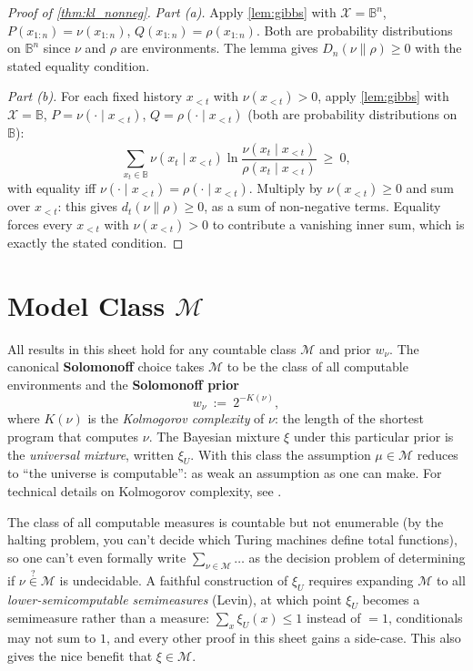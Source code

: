 \documentclass[fontsize=11pt, parskip=half]{scrartcl}
\newcommand{\Mc}{\mathcal{M}}
\begin{document}
\begin{proof}[Proof of \cref{thm:kl_nonneg}]
\textit{Part (a).} Apply \cref{lem:gibbs} with $\mathcal{X} = \mathbb{B}^n$, $P(x_{1:n}) = \nu(x_{1:n})$, $Q(x_{1:n}) = \rho(x_{1:n})$. Both are probability distributions on $\mathbb{B}^n$ since $\nu$ and $\rho$ are environments. The lemma gives $D_n(\nu \parallel \rho) \geq 0$ with the stated equality condition.

\textit{Part (b).} For each fixed history $x_{<t}$ with $\nu(x_{<t}) > 0$, apply \cref{lem:gibbs} with $\mathcal{X} = \mathbb{B}$, $P = \nu(\cdot \mid x_{<t})$, $Q = \rho(\cdot \mid x_{<t})$ (both are probability distributions on $\mathbb{B}$):
\[
  \sum_{x_t \in \mathbb{B}} \nu(x_t \mid x_{<t}) \ln \frac{\nu(x_t \mid x_{<t})}{\rho(x_t \mid x_{<t})} ~\geq~ 0,
\]
with equality iff $\nu(\cdot \mid x_{<t}) = \rho(\cdot \mid x_{<t})$. Multiply by $\nu(x_{<t}) \geq 0$ and sum over $x_{<t}$: this gives $d_t(\nu \parallel \rho) \geq 0$, as a sum of non-negative terms. Equality forces every $x_{<t}$ with $\nu(x_{<t}) > 0$ to contribute a vanishing inner sum, which is exactly the stated condition.
\end{proof}


\section{Model Class $\Mc$}\label{app:model_class}

All results in this sheet hold for any countable class $\Mc$ and prior $w_\nu$. The canonical \textbf{Solomonoff} choice takes $\Mc$ to be the class of all computable environments and the \textbf{Solomonoff prior}
\[
w_\nu ~:=~ 2^{-K(\nu)},
\]
where $K(\nu)$ is the \emph{Kolmogorov complexity} of $\nu$: the length of the shortest program that computes $\nu$. The Bayesian mixture $\xi$ under this particular prior is the \emph{universal mixture}, written $\xi_U$. With this class the assumption $\mu \in \Mc$ reduces to ``the universe is computable'': as weak an assumption as one can make. For technical details on Kolmogorov complexity, see \cite[\S2.7]{Hutter:24uaibook2}.

The class of all computable measures is countable but not enumerable (by the halting problem, you can't decide which Turing machines define total functions), so one can't even formally write
$\sum_{\nu \in \Mc} \ldots$ as the decision problem of determining if $\nu \overset{?}{\in} \Mc$ is undecidable. A faithful construction of $\xi_U$ requires expanding $\Mc$ to all \emph{lower-semicomputable semimeasures} (Levin), at which point $\xi_U$ becomes a semimeasure rather than a measure: $\sum_x \xi_U(x) \leq 1$ instead of $=1$, conditionals may not sum to $1$, and every other proof in this sheet gains a side-case. This also gives the nice benefit that $\xi \in \mathcal{M}$.
\end{document}
